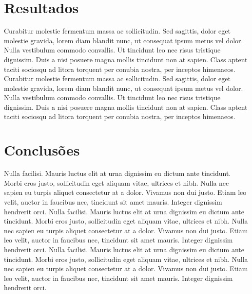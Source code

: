 \documentclass[twocolumn]{article}
\begin{document}
\section*{Resultados}

Curabitur molestie fermentum massa ac sollicitudin. Sed sagittis, dolor eget molestie gravida, lorem diam blandit nunc, ut consequat ipsum metus vel dolor. Nulla vestibulum commodo convallis. Ut tincidunt leo nec risus tristique dignissim. Duis a nisi posuere magna mollis tincidunt non at sapien. Class aptent taciti sociosqu ad litora torquent per conubia nostra, per inceptos himenaeos.
Curabitur molestie fermentum massa ac sollicitudin. Sed sagittis, dolor eget molestie gravida, lorem diam blandit nunc, ut consequat ipsum metus vel dolor. Nulla vestibulum commodo convallis. Ut tincidunt leo nec risus tristique dignissim. Duis a nisi posuere magna mollis tincidunt non at sapien. Class aptent taciti sociosqu ad litora torquent per conubia nostra, per inceptos himenaeos.

\section*{Conclusões}

Nulla facilisi. Mauris luctus elit at urna dignissim eu dictum ante tincidunt. Morbi eros justo, sollicitudin eget aliquam vitae, ultrices et nibh. Nulla nec sapien eu turpis aliquet consectetur at a dolor. Vivamus non dui justo. Etiam leo velit, auctor in faucibus nec, tincidunt sit amet mauris. Integer dignissim hendrerit orci.
Nulla facilisi. Mauris luctus elit at urna dignissim eu dictum ante tincidunt. Morbi eros justo, sollicitudin eget aliquam vitae, ultrices et nibh. Nulla nec sapien eu turpis aliquet consectetur at a dolor. Vivamus non dui justo. Etiam leo velit, auctor in faucibus nec, tincidunt sit amet mauris. Integer dignissim hendrerit orci.
Nulla facilisi. Mauris luctus elit at urna dignissim eu dictum ante tincidunt. Morbi eros justo, sollicitudin eget aliquam vitae, ultrices et nibh. Nulla nec sapien eu turpis aliquet consectetur at a dolor. Vivamus non dui justo. Etiam leo velit, auctor in faucibus nec, tincidunt sit amet mauris. Integer dignissim hendrerit orci. 




\end{document}
